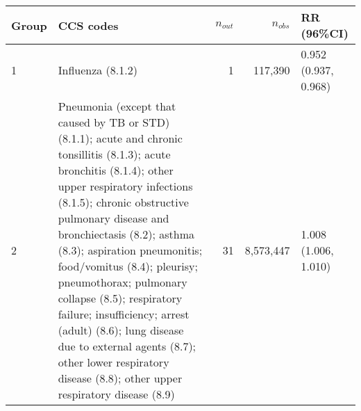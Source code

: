 \begin{tabular}{lp{6.5cm}rrp{2.2cm}}
  \hline
Group & CCS codes & $n_{out}$ & $n_{obs}$ & RR (96\%CI) \\ 
  \hline
   1 & Influenza (8.1.2) &    1 & 117,390 & 0.952 (0.937, 0.968) \\ 
     2 & Pneumonia (except that caused by TB or STD) (8.1.1); acute and chronic tonsillitis (8.1.3); acute bronchitis (8.1.4); other upper respiratory infections (8.1.5); chronic obstructive pulmonary disease and bronchiectasis (8.2); asthma (8.3); aspiration pneumonitis; food/vomitus (8.4); pleurisy; pneumothorax; pulmonary collapse (8.5); respiratory failure; insufficiency; arrest (adult) (8.6); lung disease due to external agents (8.7); other lower respiratory disease (8.8); other upper respiratory disease (8.9) &   31 & 8,573,447 & 1.008 (1.006, 1.010) \\ 
   \hline
\end{tabular}

